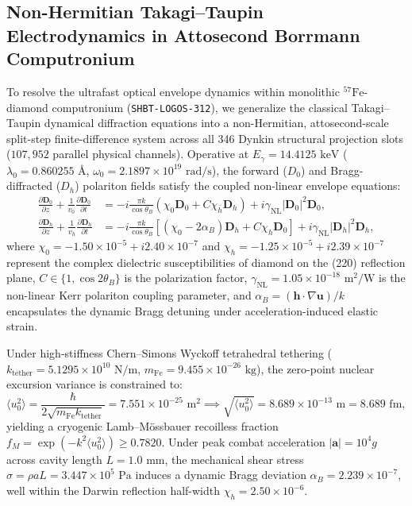 \documentclass[11pt,onecolumn]{article}
\begin{document}
\subsection{Non-Hermitian Takagi--Taupin Electrodynamics in Attosecond Borrmann Computronium}
\label{sec:takagi_taupin_electrodynamics}
To resolve the ultrafast optical envelope dynamics within monolithic $^{57}\text{Fe}$-diamond computronium (\texttt{SHBT-LOGOS-312}), we generalize the classical Takagi--Taupin dynamical diffraction equations into a non-Hermitian, attosecond-scale split-step finite-difference system across all 346 Dynkin structural projection slots ($107{,}952$ parallel physical channels). Operative at $E_\gamma = 14.4125\text{ keV}$ ($\lambda_0 = 0.860255\text{ \AA}$, $\omega_0 = 2.1897 \times 10^{19}\text{ rad/s}$), the forward ($D_0$) and Bragg-diffracted ($D_h$) polariton fields satisfy the coupled non-linear envelope equations:
\begin{align}
\frac{\partial \mathbf{D}_0}{\partial z} + \frac{1}{v_0}\frac{\partial \mathbf{D}_0}{\partial t} &= -i\frac{\pi k}{\cos\theta_B}\left(\chi_0 \mathbf{D}_0 + C \chi_{\bar{h}} \mathbf{D}_h\right) + i \gamma_{\mathrm{NL}} |\mathbf{D}_0|^2 \mathbf{D}_0, \label{eq:takagi_taupin_0} \\
\frac{\partial \mathbf{D}_h}{\partial z} + \frac{1}{v_h}\frac{\partial \mathbf{D}_h}{\partial t} &= -i\frac{\pi k}{\cos\theta_B}\left[(\chi_0 - 2\alpha_B)\mathbf{D}_h + C \chi_h \mathbf{D}_0\right] + i \gamma_{\mathrm{NL}} |\mathbf{D}_h|^2 \mathbf{D}_h, \label{eq:takagi_taupin_h}
\end{align}
where $\chi_0 = -1.50 \times 10^{-5} + i 2.40 \times 10^{-7}$ and $\chi_h = -1.25 \times 10^{-5} + i 2.39 \times 10^{-7}$ represent the complex dielectric susceptibilities of diamond on the (220) reflection plane, $C \in \{1, \cos 2\theta_B\}$ is the polarization factor, $\gamma_{\mathrm{NL}} = 1.05 \times 10^{-18}\text{ m}^2/\text{W}$ is the non-linear Kerr polariton coupling parameter, and $\alpha_B = (\mathbf{h} \cdot \nabla \mathbf{u}) / k$ encapsulates the dynamic Bragg detuning under acceleration-induced elastic strain.

Under high-stiffness Chern--Simons Wyckoff tetrahedral tethering ($k_{\mathrm{tether}} = 5.1295 \times 10^{10}\text{ N/m}$, $m_{\mathrm{Fe}} = 9.455 \times 10^{-26}\text{ kg}$), the zero-point nuclear excursion variance is constrained to:
\begin{equation}
\langle u_0^2 \rangle = \frac{\hbar}{2 \sqrt{m_{\mathrm{Fe}} k_{\mathrm{tether}}}} = 7.551 \times 10^{-25}\text{ m}^2 \implies \sqrt{\langle u_0^2 \rangle} = 8.689 \times 10^{-13}\text{ m} = 8.689\text{ fm},
\end{equation}
yielding a cryogenic Lamb--M\"ossbauer recoilless fraction $f_M = \exp(-k^2 \langle u_0^2 \rangle) \ge 0.7820$. Under peak combat acceleration $|\mathbf{a}| = 10^4g$ across cavity length $L = 1.0\text{ mm}$, the mechanical shear stress $\sigma = \rho a L = 3.447 \times 10^5\text{ Pa}$ induces a dynamic Bragg deviation $\alpha_B = 2.239 \times 10^{-7}$, well within the Darwin reflection half-width $\chi_h = 2.50 \times 10^{-6}$.
\end{document}
